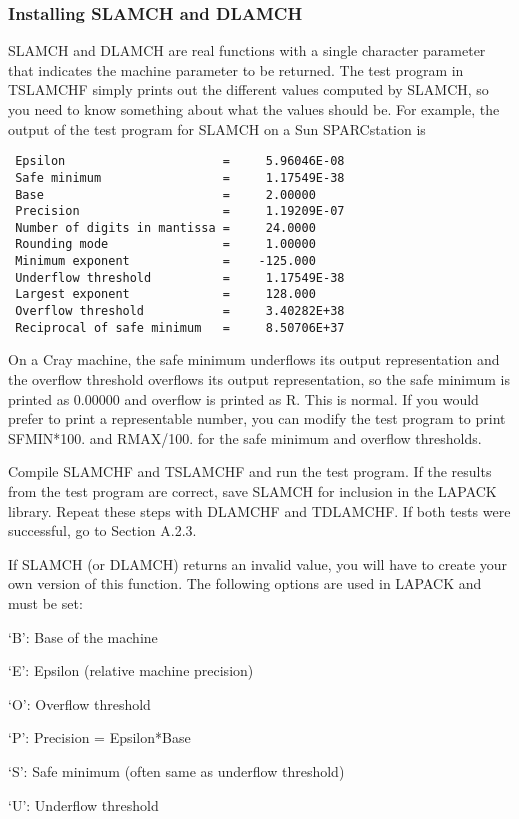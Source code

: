 \subsubsection{Installing SLAMCH and DLAMCH}
\dent
SLAMCH and DLAMCH are real functions with a single character parameter
that indicates the machine parameter to be returned.  The test 
program in TSLAMCHF
simply prints out the different values computed by SLAMCH,
so you need to know something about what the values should be. 
For example, the output of the test program for SLAMCH 
on a Sun SPARCstation is
\begin{verbatim}
 Epsilon                      =     5.96046E-08
 Safe minimum                 =     1.17549E-38
 Base                         =     2.00000
 Precision                    =     1.19209E-07
 Number of digits in mantissa =     24.0000
 Rounding mode                =     1.00000
 Minimum exponent             =    -125.000
 Underflow threshold          =     1.17549E-38
 Largest exponent             =     128.000
 Overflow threshold           =     3.40282E+38
 Reciprocal of safe minimum   =     8.50706E+37
\end{verbatim}
On a Cray machine, the safe minimum underflows its output
representation and the overflow threshold overflows its output
representation, so the safe minimum is printed as 0.00000 and overflow
is printed as R.  This is normal.
If you would prefer to print a representable number, you can modify
the test program to print SFMIN*100. and RMAX/100. for the safe
minimum and overflow thresholds.

Compile SLAMCHF and TSLAMCHF and run the test program.
If the results from the test program are correct, save SLAMCH for
inclusion in the LAPACK library.
Repeat these steps with DLAMCHF and TDLAMCHF.
If both tests were successful, go to Section A.2.3.

If SLAMCH (or DLAMCH) returns an invalid value, you will have to create
your own version of this function.  The following options are used in
LAPACK and must be set:

\begin{list}{}{}
\item {`B': }  Base of the machine
\item {`E': }  Epsilon (relative machine precision)
\item {`O': }  Overflow threshold
\item {`P': }  Precision = Epsilon*Base
\item {`S': }  Safe minimum (often same as underflow threshold)
\item {`U': }  Underflow threshold
\end{list}

